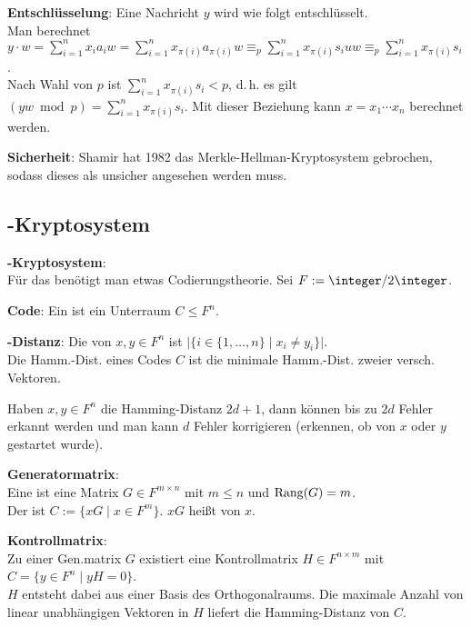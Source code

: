 \textbf{Entschlüsselung}:
Eine Nachricht $y$ wird wie folgt entschlüsselt.\\
Man berechnet $y \cdot w = \sum_{i=1}^n x_i a_i w
= \sum_{i=1}^n x_{\pi(i)} a_{\pi(i)} w
\equiv_p \sum_{i=1}^n x_{\pi(i)} s_i uw
\equiv_p \sum_{i=1}^n x_{\pi(i)} s_i$.\\
Nach Wahl von $p$ ist $\sum_{i=1}^n x_{\pi(i)} s_i < p$, d.\,h. es gilt
$(yw \bmod p) = \sum_{i=1}^n x_{\pi(i)} s_i$.
Mit dieser Beziehung kann $x = x_1 \dotsb x_n$ berechnet werden.

\linie

\textbf{Sicherheit}:
Shamir hat 1982 das Merkle-Hellman-Kryptosystem gebrochen,
sodass dieses als unsicher angesehen werden muss.

\pagebreak

\subsection{%
    -Kryptosystem%
}

\textbf{-Kryptosystem}:\\
Für das  benötigt man etwas Codierungstheorie.
Sei $F := \integer/2\integer$.

\textbf{Code}:
Ein  ist ein Unterraum $C \le F^n$.

\textbf{-Distanz}:
Die  von $x, y \in F^n$ ist
$|\{i \in \{1, \dotsc, n\} \;|\; x_i \not= y_i\}|$.\\
Die Hamm.-Dist. eines Codes $C$ ist die minimale Hamm.-Dist. zweier versch. Vektoren.

Haben $x, y \in F^n$ die Hamming-Distanz $2d + 1$, dann können bis zu $2d$ Fehler erkannt werden
und man kann $d$ Fehler korrigieren (erkennen, ob von $x$ oder $y$ gestartet wurde).

\textbf{Generatormatrix}:\\
Eine  ist eine Matrix $G \in F^{m \times n}$ mit $m \le n$ und
$\operatorname{Rang}(G) = m$.\\
Der  ist $C := \{xG \;|\; x \in F^m\}$.
$xG$ heißt  von $x$.

\textbf{Kontrollmatrix}:\\
Zu einer Gen.matrix $G$ existiert eine Kontrollmatrix $H \in F^{n \times m}$ mit
$C = \{y \in F^n \;|\; yH = 0\}$.\\
$H$ entsteht dabei aus einer Basis des Orthogonalraums.
Die maximale Anzahl von linear unabhängigen Vektoren in $H$ liefert die Hamming-Distanz von $C$.

